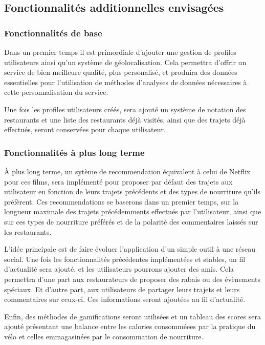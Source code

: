 \documentclass[12pt]{article}
\begin{document}
\subsection{Fonctionnalités additionnelles envisagées}

    \subsubsection{Fonctionnalités de base}

        Dans un premier temps il est primordiale d'ajouter une gestion de profiles utilisateurs ainsi qu'un système de géolocalisation. Cela permettra d'offrir un service de bien meilleure qualité, plus personalisé, et produira des données essentielles pour l'utilisation de méthodes d'analyses de données nécessaires à cette personnalisation du service.

        Une fois les profiles utilisateurs créés, sera ajouté un système de notation des restaurants et une liste des restaurants déjà visités, ainsi que des trajets déjà effectués, seront conservées pour chaque utilisateur.

    \subsubsection{Fonctionnalités à plus long terme}

        À plus long terme, un sytème de recommendation équivalent à celui de Netflix pour ces films, sera implémenté pour proposer par défaut des trajets aux utilisateur en fonction de leurs trajets précédents et des types de nourriture qu'ils préfèrent. Ces recommendations se baserons dans un premier temps, sur la longueur maximale des trajets précédemments effectués par l'utilisateur, ainsi que sur ces types de nourriture préférés et de la polarité des commentaires laissés sur les restaurants. 

        L'idée principale est de faire évoluer l'application d'un simple outil à une réseau social. Une fois les fonctionnalités précédentes implémentées et stables, un fil d'actualité sera ajouté, et les utilisateurs pourrons ajouter des amis. Cela permettra d'une part aux restaurateurs de proposer des rabais ou des évènements spéciaux. Et d'autre part, aux utilisateurs de partager leurs trajets et leurs commentaires sur ceux-ci. Ces informations seront ajoutées au fil d'actualité.

        Enfin, des méthodes de gamifications seront utilisées et un tableau des scores sera ajouté présentant une balance entre les calories consomméees par la pratique du vélo et celles emmagasinées par le consommation de nourriture.
\end{document}
